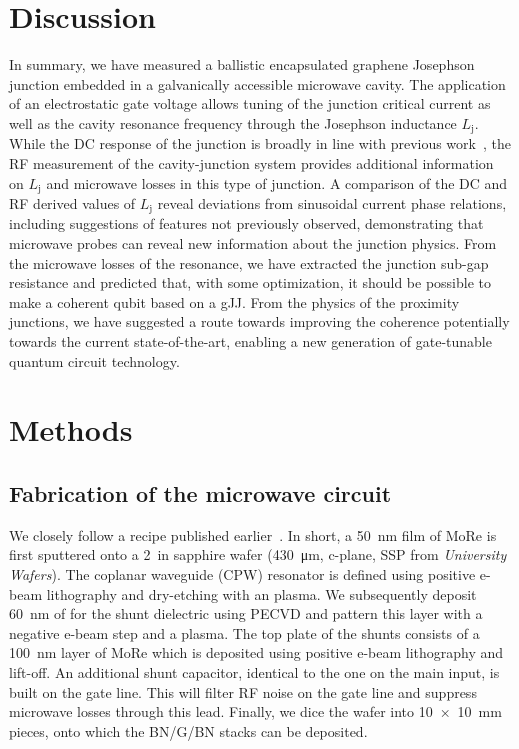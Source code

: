 \section{Discussion}

In summary, we have measured a ballistic encapsulated graphene Josephson junction embedded in a galvanically accessible microwave cavity.
The application of an electrostatic gate voltage allows tuning of the junction critical current as well as the cavity resonance frequency through the Josephson inductance $L_\text{j}$.
While the DC response of the junction is broadly in line with previous work~\cite{caladoBallisticJosephsonJunctions2015d,benshalomQuantumOscillationsCritical2015,leeUltimatelyShortBallistic2015}, the RF measurement of the cavity-junction system provides additional information on $L_\text{j}$ and microwave losses in this type of junction.
A comparison of the DC and RF derived values of $L_\text{j}$ reveal deviations from sinusoidal current phase relations, including suggestions of features not previously observed, demonstrating that microwave probes can reveal new information about the junction physics. 
From the microwave losses of the resonance, we have extracted the junction sub-gap resistance and predicted that, with some optimization, it should be possible to make a coherent qubit based on a gJJ.
From the physics of the proximity junctions, we have suggested a route towards improving the coherence potentially towards the current state-of-the-art, enabling a new generation of gate-tunable quantum circuit technology. 


\section{Methods}
\subsection{Fabrication of the microwave circuit}
We closely follow a recipe published earlier~\cite{bosmanBroadbandArchitectureGalvanically2015c,singhMolybdenumrheniumAlloyBased2014}.
In short, a \SI{50}{\nano\meter} film of MoRe is first sputtered onto a \SI{2}{in} sapphire wafer (\SI{430}{\micro\meter}, c-plane, SSP from \textit{University Wafers}).
The coplanar waveguide (CPW) resonator is defined using positive e-beam lithography and dry-etching with an  plasma.
We subsequently deposit \SI{60}{\nano\meter} of  for the shunt dielectric using PECVD and pattern this layer with a negative e-beam step and a  plasma.
The top plate of the shunts consists of a \SI{100}{\nano\meter} layer of MoRe which is deposited using positive e-beam lithography and lift-off.
An additional shunt capacitor, identical to the one on the main input, is built on the gate line.
This will filter RF noise on the gate line and suppress microwave losses through this lead.
Finally, we dice the wafer into \SI{10x10}{\milli\meter} pieces, onto which the BN/G/BN stacks can be deposited.

